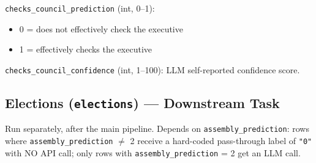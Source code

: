\documentclass[11pt, a4paper]{article}
\newenvironment{promptquote}{%
  \begin{quote}\small
}{%
  \end{quote}
}
\begin{document}


\texttt{checks\_council\_prediction} (int, 0--1):
\begin{itemize}[nosep, leftmargin=1.7em]
  \item 0 = does not effectively check the executive
  \item 1 = effectively checks the executive
\end{itemize}
\texttt{checks\_council\_confidence} (int, 1--100): LLM self-reported confidence score.

\subsection{Elections (\texttt{elections}) --- Downstream Task}

Run separately, after the main pipeline. Depends on \texttt{assembly\_\allowbreak prediction}: rows where \texttt{assembly\_\allowbreak prediction}
$\neq$ 2 receive a hard-coded pass-through label of \texttt{"0"} with NO API call;
only rows with \texttt{assembly\_\allowbreak prediction} = 2 get an LLM call.


\end{document}
